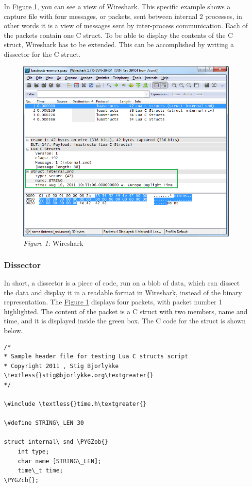\documentclass[A4paper,10pt,english]{sphinxmanual}
\def\PYGZob{\char`\{}
\def\PYGZcb{\char`\}}
\begin{document}
In {\hyperref[user/intro:figure-1]{Figure 1}}, you can see a view of Wireshark. This specific example shows a capture file with four messages, or packets, sent between internal 2 processes, in other words it is a view of messages sent by inter-process communication. Each of the packets contain one C struct. To be able to display the contents of the C struct, Wireshark has to be extended. This can be accomplished by writing a dissector for the C struct.
\begin{figure}[htbp]
\centering
\capstart

\includegraphics[width=\linewidth]{img/wireshark_example.png}
\caption{\emph{Figure 1:} Wireshark}\label{user/intro:figure-1}\end{figure}


\subsubsection{Dissector}
\label{user/intro:dissector}
In short, a dissector is a piece of code, run on a blob of data, which can dissect the data and display it in a readable format in Wireshark, instead of the binary representation.
The {\hyperref[user/intro:figure-1]{Figure 1}} displays four packets, with packet number 1 highlighted. The content of the packet is a C struct with two members, name and time, and it is displayed inside the green box. The C code for the struct is shown below.

\begin{Verbatim}[commandchars=\\\{\}]
/*
* Sample header file for testing Lua C structs script
* Copyright 2011 , Stig Bjorlykke \textless{}stig@bjorlykke.org\textgreater{}
*/

\#include \textless{}time.h\textgreater{}

\#define STRING\_LEN 30

struct internal\_snd \PYGZob{}
    int type;
    char name [STRING\_LEN];
    time\_t time;
\PYGZcb{};
\end{Verbatim}
\end{document}
